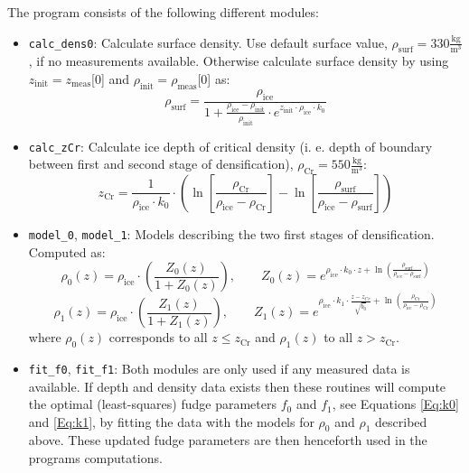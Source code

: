 \documentclass[../../CompleteThesis/Complete_1stDraft.tex]{subfiles}
\begin{document}
The program consists of the following different modules:
\begin{itemize}
	\item \lstinline[columns=fixed]|calc_dens0|:  Calculate surface density. Use default surface value, $\rho_{\text{surf}} = 330 \frac{\text{kg}}{\text{m}^3}$, if no measurements available. Otherwise calculate surface density by using $z_{\text{init}} = z_{\text{meas}}$[0] and $\rho_{\text{init}} = \rho_{\text{meas}}$[0] as:
	\begin{equation}
		\rho_{\text{surf}} = \frac{\rho_{\text{ice}}}{1 + \frac{\rho_{\text{ice}} - \rho_{\text{init}}}{\rho_{\text{init}}}\cdot e^{z_{\text{init}}\cdot \rho_{\text{ice}}\cdot k_0}}
		\label{Eq:rhoSurf}
	\end{equation}

	\item \lstinline[columns=fixed]|calc_zCr|: Calculate ice depth of critical density (i. e. depth of boundary between first and second stage of densification), $\rho_{\text{Cr}}=550\frac{\text{kg}}{\text{m}^3}$:
	\begin{equation}
		z_{\text{Cr}} = \frac{1}{\rho_{\text{ice}}\cdot k_0}\cdot\left(\ln \left[\frac{\rho_{\text{Cr}}}{\rho_{\text{ice}} - \rho_{\text{Cr}}}\right]-\ln\left[\frac{\rho_{\text{surf}}}{\rho_{\text{ice}} - \rho_{\text{surf}}}\right]\right)
		\label{Eq:zCr}
	\end{equation}
	
	\item \lstinline[columns=fixed]|model_0|, \lstinline[columns=fixed]|model_1|: Models describing the two first stages of densification. Computed as:
	\begin{equation}
		\rho_0(z) = \rho_{\text{ice}}\cdot \left(\frac{Z_0(z)}{1+Z_0(z)}\right), \qquad Z_0(z) = e^{\rho_{\text{ice}}\cdot k_0 \cdot z + \ln(\frac{\rho_{\text{surf}}}{\rho_{\text{ice}} - \rho_{\text{surf}}})}
		\label{Eq:rhoModel0}
	\end{equation}
	\begin{equation}
		\rho_1(z) = \rho_{\text{ice}}\cdot \left(\frac{Z_1(z)}{1+Z_1(z)}\right), \qquad Z_1(z) = e^{\rho_{\text{ice}}\cdot k_1 \cdot \frac{z - z_{Cr}}{\sqrt{\dot{b}_0}} + \ln(\frac{\rho_{\text{Cr}}}{\rho_{\text{ice}} - \rho_{\text{Cr}}})}
		\label{Eq:rhoModel1}
	\end{equation}
	where $\rho_0(z)$ corresponds to all $z \leq z_{\text{Cr}}$ and $\rho_1(z)$ to all $z > z_{\text{Cr}}$.
	\item \lstinline[columns=fixed]|fit_f0|,  \lstinline[columns=fixed]|fit_f1|: Both modules are only used if any measured data is available. If depth and density data exists then these routines will compute the optimal (least-squares) fudge parameters $f_0$ and $f_1$, see Equations \ref{Eq:k0} and \ref{Eq:k1}, by fitting the data with the models for $\rho_0$ and $\rho_1$ described above. These updated fudge parameters are then henceforth used in the programs computations.
	

\end{itemize}
\end{document}
